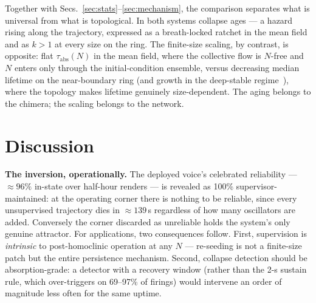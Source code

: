 \documentclass[pdflatex,sn-mathphys,Numbered]{sn-jnl}
\begin{document}
Together with Secs.~\ref{sec:stats}--\ref{sec:mechanism}, the comparison
separates what is universal from what is topological. In both systems collapse
ages --- a hazard rising along the trajectory, expressed as a breath-locked
ratchet in the mean field and as $k > 1$ at every size on the ring. The
finite-size scaling, by contrast, is opposite: flat $\tau_{\mathrm{abs}}(N)$ in
the mean field, where the collective flow is $N$-free and $N$ enters only
through the initial-condition ensemble, versus decreasing median lifetime on the
near-boundary ring (and growth in the deep-stable regime~\cite{wo2011}), where
the topology makes lifetime genuinely size-dependent. The aging belongs to the
chimera; the scaling belongs to the network.

\section{Discussion}\label{sec:discussion}

\textbf{The inversion, operationally.} The deployed voice's celebrated reliability
--- $\approx 96\%$ in-state over half-hour renders --- is revealed as 100\%
supervisor-maintained: at the operating corner there is nothing to be reliable,
since every unsupervised trajectory dies in $\approx 139$\,s regardless of how many
oscillators are added. Conversely the corner discarded as unreliable holds the
system's only genuine attractor. For applications, two consequences follow. First,
supervision is \emph{intrinsic} to post-homoclinic operation at any $N$ ---
re-seeding is not a finite-size patch but the entire persistence mechanism. Second,
collapse detection should be absorption-grade: a detector with a recovery window
(rather than the 2-s sustain rule, which over-triggers on 69--97\% of firings)
would intervene an order of magnitude less often for the same uptime.
\end{document}
